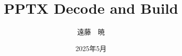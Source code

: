 
\title{PPTX Decode and Build}
\author{遠藤　暁}
\date{2025年5月}



\frontmatter
\maketitle
\tableofcontents

\let\oldsection\section
\renewcommand{\section}[1]{\oldsection*{#1}}

\let\section\oldsection

\mainmatter





\appendix


\backmatter


